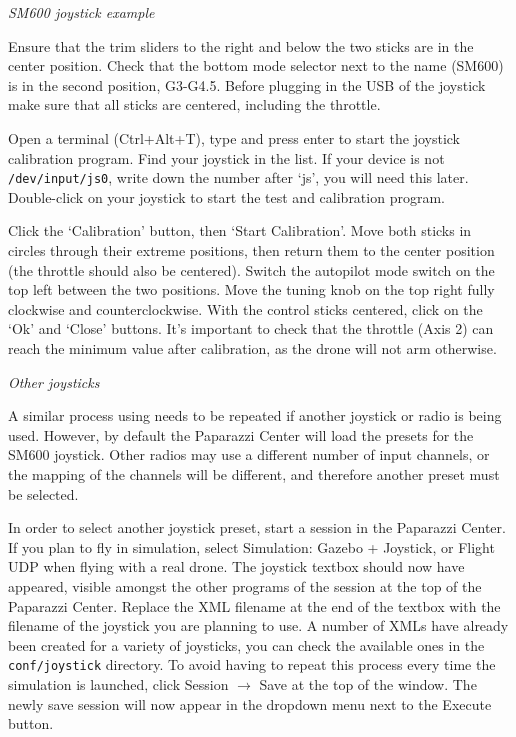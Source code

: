 \textit{SM600 joystick example}

Ensure that the trim sliders to the right and below the two sticks are in the center position. Check that the bottom mode selector next to the name (SM600) is in the second position, G3-G4.5. Before plugging in the USB of the joystick make sure that all sticks are centered, including the throttle.

Open a terminal (Ctrl+Alt+T), type  and press enter to start the joystick calibration program. Find your joystick in the list. If your device is not \verb"/dev/input/js0", write down the number after `js', you will need this later. Double-click on your joystick to start the test and calibration program.

Click the `Calibration' button, then `Start Calibration'. Move both sticks in circles through their extreme positions, then return them to the center position (the throttle should also be centered). Switch the autopilot mode switch on the top left between the two positions. Move the tuning knob on the top right fully clockwise and counterclockwise. With the control sticks centered, click on the `Ok' and `Close' buttons. It's important to check that the throttle (Axis 2) can reach the minimum value after calibration, as the drone will not arm otherwise.

\textit{Other joysticks}

A similar process using  needs to be repeated if another joystick or radio is being used. However, by default the Paparazzi Center will load the presets for the SM600 joystick. Other radios may use a different number of input channels, or the mapping of the channels will be different, and therefore another preset must be selected.

In order to select another joystick preset, start a session in the Paparazzi Center. If you plan to fly in simulation, select Simulation: Gazebo + Joystick, or Flight UDP when flying with a real drone. The joystick textbox should now have appeared, visible amongst the other programs of the session at the top of the Paparazzi Center. Replace the XML filename at the end of the textbox with the filename of the joystick you are planning to use. A number of XMLs have already been created for a variety of joysticks, you can check the available ones in the \texttt{conf/joystick} directory. To avoid having to repeat this process every time the simulation is launched, click Session $\to$ Save at the top of the window. The newly save session will now appear in the dropdown menu next to the Execute button.

